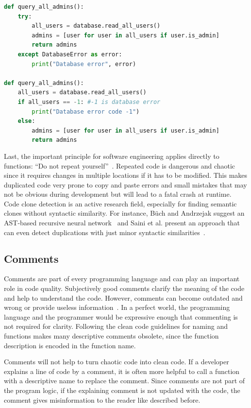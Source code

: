 \begin{lstlisting}[float=t , language=Python, label=lst:error_catching, caption={Sample listing for error handling with try and except statements vs error codes.}]
def query_all_admins():
    try:
        all_users = database.read_all_users()
        admins = [user for user in all_users if user.is_admin]
        return admins
    except DatabaseError as error:
        print("Database error", error)

def query_all_admins():
    all_users = database.read_all_users()
    if all_users == -1: #-1 is database error
        print("Database error code -1")
    else:
        admins = [user for user in all_users if user.is_admin]
        return admins
\end{lstlisting}


Last, the important principle for software engineering applies directly to functions: \enquote{Do not repeat yourself}~\cite{haoyu_basic_2012}. Repeated code is dangerous and chaotic since it requires changes in multiple locations if it has to be modified. This makes duplicated code very prone to copy and paste errors and small mistakes that may not be obvious during development but will lead to a fatal crash at runtime. Code clone detection is an active research field, especially for finding semantic clones without syntactic similarity. For instance, Büch and Andrzejak suggest an AST-based recursive neural network~\cite{buch_learning-based_2019} and Saini et al. present an approach that can even detect duplications with just minor syntactic similarities~\cite{saini_oreo_2018}.

\subsection{Comments}
Comments are part of every programming language and can play an important role in code quality. Subjectively good comments clarify the meaning of the code and help to understand the code. However, comments can become outdated and wrong or provide useless information~\cite{martin_clean_2009}. In a perfect world, the programming language and the programmer would be expressive enough that commenting is not required for clarity. Following the clean code guidelines for naming and functions makes many descriptive comments obsolete, since the function description is encoded in the function name.

Comments will not help to turn chaotic code into clean code. If a developer explains a line of code by a comment, it is often more helpful to call a function with a descriptive name to replace the comment. Since comments are not part of the program logic, if the explaining comment is not updated with the code, the comment gives misinformation to the reader like described before.


